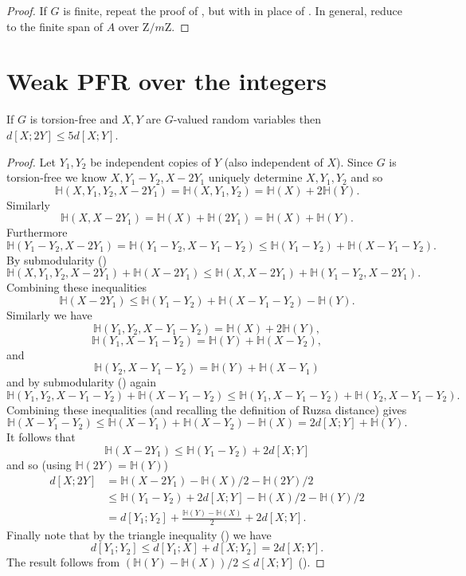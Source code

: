  \begin{proof}\leanok If $G$ is finite, repeat the proof of , but with  in place of . In general, reduce to the finite span of $A$ over $\mathrm{Z}/m\mathrm{Z}$.
  \end{proof}


\chapter{Weak PFR over the integers}

\begin{lemma}\label{torsion-free-doubling}\leanok
If $G$ is torsion-free and $X,Y$ are $G$-valued random variables then $d[X;2Y]\leq 5d[X;Y]$.
\end{lemma}
\begin{proof}
\leanok
Let $Y_1,Y_2$ be independent copies of $Y$ (also independent of $X$). Since $G$ is torsion-free we know $X,Y_1-Y_2,X-2Y_1$ uniquely determine $X,Y_1,Y_2$ and so
\[\mathbb{H}(X,Y_1,Y_2,X-2Y_1)=\mathbb{H}(X,Y_1,Y_2)=\mathbb{H}(X)+2\mathbb{H}(Y).\]
Similarly
\[\mathbb{H}(X,X-2Y_1)=\mathbb{H}(X)+\mathbb{H}(2Y_1)=\mathbb{H}(X)+\mathbb{H}(Y).\]
Furthermore
\[\mathbb{H}(Y_1-Y_2,X-2Y_1)=\mathbb{H}(Y_1-Y_2,X-Y_1-Y_2)\leq \mathbb{H}(Y_1-Y_2)+\mathbb{H}(X-Y_1-Y_2).\]
By submodularity ()
\[\mathbb{H}(X,Y_1,Y_2,X-2Y_1)+\mathbb{H}(X-2Y_1)\leq \mathbb{H}(X,X-2Y_1)+\mathbb{H}(Y_1-Y_2,X-2Y_1).\]
Combining these inequalities
\[\mathbb{H}(X-2Y_1)\leq \mathbb{H}(Y_1-Y_2)+\mathbb{H}(X-Y_1-Y_2)-\mathbb{H}(Y).\]
Similarly we have
\[\mathbb{H}(Y_1,Y_2,X-Y_1-Y_2)=\mathbb{H}(X)+2\mathbb{H}(Y),\]
\[\mathbb{H}(Y_1,X-Y_1-Y_2)=\mathbb{H}(Y)+\mathbb{H}(X-Y_2),\]
and
\[\mathbb{H}(Y_2,X-Y_1-Y_2)=\mathbb{H}(Y)+\mathbb{H}(X-Y_1)\]
and by submodularity () again
\[\mathbb{H}(Y_1,Y_2,X-Y_1-Y_2)+ \mathbb{H}(X-Y_1-Y_2)\leq \mathbb{H}(Y_1,X-Y_1-Y_2)+\mathbb{H}(Y_2,X-Y_1-Y_2).\]
Combining these inequalities (and recalling the definition of Ruzsa distance) gives
\[\mathbb{H}(X-Y_1-Y_2)\leq \mathbb{H}(X-Y_1)+\mathbb{H}(X-Y_2)-\mathbb{H}(X)=2d[X;Y]+\mathbb{H}(Y).\]
It follows that
\[\mathbb{H}(X-2Y_1)\leq \mathbb{H}(Y_1-Y_2)+2d[X;Y]\]
and so (using $\mathbb{H}(2Y)=\mathbb{H}(Y)$)
\begin{align*}
d[X;2Y]
&=\mathbb{H}(X-2Y_1)-\mathbb{H}(X)/2-\mathbb{H}(2Y)/2\\
&\leq \mathbb{H}(Y_1-Y_2)+2d[X;Y]-\mathbb{H}(X)/2-\mathbb{H}(Y)/2\\
&= d[Y_1;Y_2]+\frac{\mathbb{H}(Y)-\mathbb{H}(X)}{2}+2d[X;Y].
\end{align*}
Finally note that by the triangle inequality () we have
\[d[Y_1;Y_2]\leq d[Y_1;X]+d[X;Y_2]=2d[X;Y].\]
The result follows from $(\mathbb{H}(Y)-\mathbb{H}(X))/2\leq d[X;Y]$ ().
\end{proof}

